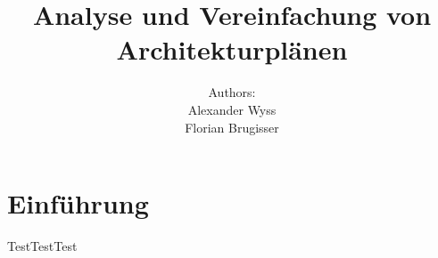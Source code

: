 \documentclass[11pt, a4paper]{report}
\begin{document}
	\title{\textbf{Analyse und Vereinfachung von Architekturplänen}}
	\author{
		Authors: \\
		Alexander Wyss \\
		Florian Brugisser \\
	}
	\maketitle
	\tableofcontents
	
	\chapter[Test]{Einführung}
	TestTestTest
\end{document}
